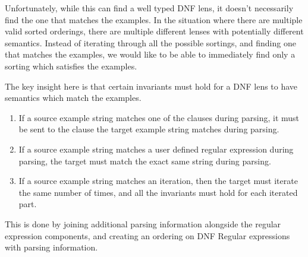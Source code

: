 Unfortunately, while this can find a well typed DNF lens, it doesn't
necessarily find the one that matches the examples.  In the situation where
there are multiple valid sorted orderings, there are multiple different lenses
with potentially different semantics.  Instead of iterating through all the
possible sortings, and finding one that matches the examples, we would like to
be able to immediately find only a sorting which satisfies the examples.

The key insight here is that certain invariants must hold for a DNF lens to have
semantics which match the examples.

\begin{enumerate}
\item If a source example string matches one of the clauses during parsing,
it must be sent to the clause the target example string matches during parsing.
\item If a source example string matches a user defined regular expression during
parsing, the target must match the exact same string during parsing.
\item If a source example string matches an iteration, then the target must iterate
the same number of times, and all the invariants must hold for each iterated part.
\end{enumerate}

This is done by joining additional parsing information alongside the regular
expression components, and creating an ordering on DNF Regular expressions
with parsing information.

